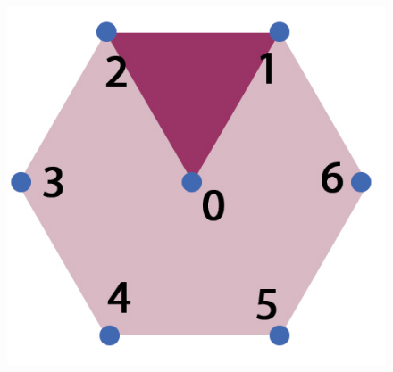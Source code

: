 \documentclass{beamer}
\begin{document}
\begin{frame}
\begin{figure}
\begin{minipage}{.5\textwidth}
\includegraphics[scale=0.2]{./images/jpgHexGridStruc.jpg}
\label{fig:HexGridStructure}
\end{minipage}
\end{figure}



\end{frame}
\end{document}
